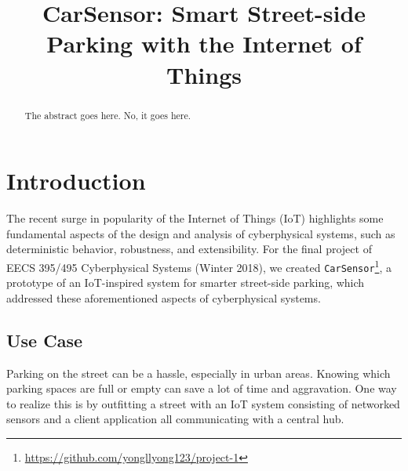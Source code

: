\documentclass[conference]{IEEEtran}
\begin{document}
\title{CarSensor: Smart Street-side Parking with the Internet of Things}

\author{
	\and
	}
	
\maketitle

\begin{abstract}
	The abstract goes here.
	No, it goes here.
\end{abstract}

\section{Introduction}
The recent surge in popularity of the Internet of Things (IoT) highlights some fundamental aspects of the design and analysis of cyberphysical systems, such as deterministic behavior, robustness, and extensibility. For the final project of EECS 395/495 Cyberphysical Systems (Winter 2018), we created \texttt{CarSensor}\footnote{\url{https://github.com/yongllyong123/project-1}}, a prototype of an IoT-inspired system for smarter street-side parking, which addressed these aforementioned aspects of cyberphysical systems.

\subsection{Use Case}
Parking on the street can be a hassle, especially in urban areas. Knowing which parking spaces are full or empty can save a lot of time and aggravation. One way to realize this is by outfitting a street with an IoT system consisting of networked sensors and a client application all communicating with a central hub.
\end{document}

